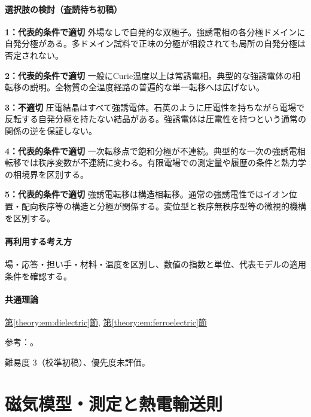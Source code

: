 \paragraph{選択肢の検討（査読待ち初稿）}\mbox{}\par

\noindent\textbf{1：代表的条件で適切} 外場なしで自発的な双極子。強誘電相の各分極ドメインに自発分極がある。多ドメイン試料で正味の分極が相殺されても局所の自発分極は否定されない。\par

\noindent\textbf{2：代表的条件で適切} 一般にCurie温度以上は常誘電相。典型的な強誘電体の相転移の説明。全物質の全温度経路の普遍的な単一転移へは広げない。\par

\noindent\textbf{3：不適切} 圧電結晶はすべて強誘電体。石英のように圧電性を持ちながら電場で反転する自発分極を持たない結晶がある。強誘電体は圧電性を持つという通常の関係の逆を保証しない。\par

\noindent\textbf{4：代表的条件で適切} 一次転移点で飽和分極が不連続。典型的な一次の強誘電相転移では秩序変数が不連続に変わる。有限電場での測定量や履歴の条件と熱力学の相境界を区別する。\par

\noindent\textbf{5：代表的条件で適切} 強誘電転移は構造相転移。通常の強誘電性ではイオン位置・配向秩序等の構造と分極が関係する。変位型と秩序無秩序型等の微視的機構を区別する。\par

\paragraph{再利用する考え方} 場・応答・担い手・材料・温度を区別し、数値の指数と単位、代表モデルの適用条件を確認する。

\paragraph{共通理論} \hyperref[theory:em:dielectric]{第\ref*{theory:em:dielectric}節}, \hyperref[theory:em:ferroelectric]{第\ref*{theory:em:ferroelectric}節}

\par 参考：\cite{mit_ferroelectric,em51_quartz,em51_ferro_transition}。

\par 難易度 3（校準初稿）、優先度未評価。

\section{磁気模型・測定と熱電輸送則}

